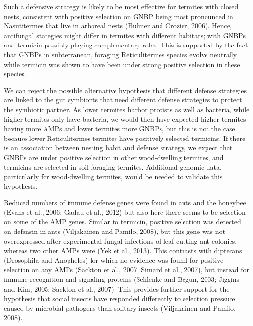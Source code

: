 \documentclass[11pt]{article}
\begin{document}
\begin{sloppypar}
Such a defensive strategy is likely to be most effective for termites with closed nests, consistent with positive selection on GNBP being most pronounced in Nasutitermes that live in arboreal nests (Bulmer and Crozier, 2006). 
Hence, antifungal stategies might differ in termites with different habitats; with GNBPs and termicin possibly playing complementary roles. 
This is supported by the fact that GNBPs in subterranean, foraging Reticulitermes species evolve neutrally while termicin was shown to have been under strong positive selection in these species.
\par
We can reject the possible alternative hypothesis that different defense strategies are linked to the gut symbionts that need different defense strategies to protect the symbiotic partner. 
As lower termites harbor protists as well as bacteria, while higher termites only have bacteria, we would then have expected higher termites having more AMPs and lower termites more GNBPs, but this is not the case because lower Reticulitermes termites have positively selected termicins. 
If there is an association between nesting habit and defense strategy, we expect that GNBPs are under positive selection in other wood-dwelling termites, and termicins are selected in soil-foraging termites. 
Additional genomic data, particularly for wood-dwelling termites, would be needed to validate this hypothesis.
\par
Reduced numbers of immune defense genes were found in ants and the honeybee (Evans et al., 2006; Gadau et al., 2012) but also here there seems to be selection on some of the AMP genes. Similar to termicin, positive selection was detected on defensin in ants (Viljakainen and Pamilo, 2008), but this gene was not overexpressed after experimental fungal infections of leaf-cutting ant colonies, whereas two other AMPs were (Yek et al., 2013). This contrasts with dipterans (Drosophila and Anopheles) for which no evidence was found for positive selection on any AMPs (Sackton et al., 2007; Simard et al., 2007), but instead for immune recognition and signaling proteins (Schlenke and Begun, 2003; Jiggins and Kim, 2005; Sackton et al., 2007). This provides further support for the hypothesis that social insects have responded differently to selection pressure caused by microbial pathogens than solitary insects (Viljakainen and Pamilo, 2008).
\par

\end{sloppypar}
\end{document}
